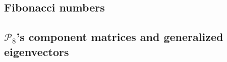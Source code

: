 \newpage
\vspace*{-1cm}


\subsection{Fibonacci numbers}



\subsection{$\mathcal{P}_{8}$'s component matrices and generalized eigenvectors}
\label{subsec:Pascal-component-matrices-generalized-eigenvectors}



\iffalse %


\fi



